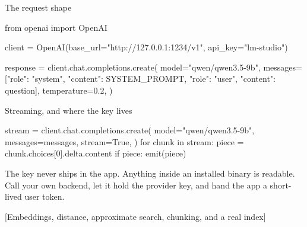 \documentclass[10pt,aspectratio=169,t]{beamer}
\begin{document}
\begin{frame}[fragile,eyebrow=Conversation]{The request shape}
\begin{codeblock}[language=Python]
from openai import OpenAI

client = OpenAI(base_url="http://127.0.0.1:1234/v1", api_key="lm-studio")

response = client.chat.completions.create(
    model="qwen/qwen3.5-9b",
    messages=[{"role": "system", "content": SYSTEM_PROMPT},
              {"role": "user", "content": question}],
    temperature=0.2,
)
\end{codeblock}
  \vskip 1mm
\end{frame}

\begin{frame}[fragile,eyebrow=Conversation]{Streaming, and where the key lives}
\begin{codeblock}[language=Python]
stream = client.chat.completions.create(
    model="qwen/qwen3.5-9b", messages=messages, stream=True,
)
for chunk in stream:
    piece = chunk.choices[0].delta.content
    if piece:
        emit(piece)
\end{codeblock}
  \vskip 2mm
  \begin{takeaway}{The key never ships in the app.}
    Anything inside an installed binary is readable. Call your own backend, let it hold the provider key, and hand the app a short-lived user token.
  \end{takeaway}
\end{frame}

[Embeddings, distance, approximate search, chunking, and a real index]
\end{document}
